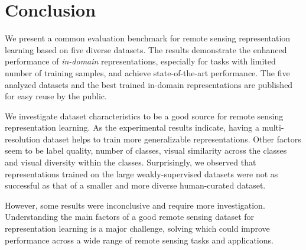\section{Conclusion}
We present a common evaluation benchmark for remote sensing representation learning based on five diverse datasets. The results demonstrate the enhanced performance of \emph{in-domain} representations, especially for tasks with limited number of training samples, and achieve state-of-the-art performance.
The five analyzed datasets and the best trained in-domain representations are published for easy reuse by the public.

We investigate dataset characteristics to be a good source for remote sensing representation learning. 
As the experimental results indicate, having a multi-resolution dataset helps to train more generalizable representations. Other factors seem to be label quality, number of classes, visual similarity across the classes and visual diversity within the classes. Surprisingly, we observed that representations trained on the large weakly-supervised datasets were not as successful as that of a smaller and more diverse human-curated dataset.

However, some results were inconclusive and require more investigation. Understanding the main factors of a good remote sensing dataset for representation learning is a major challenge, solving which could improve performance  across a wide range of remote sensing tasks and applications.





